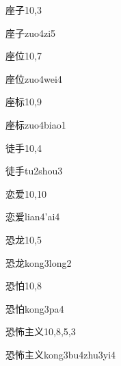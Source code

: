 \begin{entry}{座子}{10,3}
  \begin{phonetics}{座子}{zuo4zi5}
  \end{phonetics}
\end{entry}

\begin{entry}{座位}{10,7}
  \begin{phonetics}{座位}{zuo4wei4}
  \end{phonetics}
\end{entry}

\begin{entry}{座标}{10,9}
  \begin{phonetics}{座标}{zuo4biao1}
  \end{phonetics}
\end{entry}

\begin{entry}{徒手}{10,4}
  \begin{phonetics}{徒手}{tu2shou3}
  \end{phonetics}
\end{entry}

\begin{entry}{恋爱}{10,10}
  \begin{phonetics}{恋爱}{lian4'ai4}
  \end{phonetics}
\end{entry}

\begin{entry}{恐龙}{10,5}
  \begin{phonetics}{恐龙}{kong3long2}
  \end{phonetics}
\end{entry}

\begin{entry}{恐怕}{10,8}
  \begin{phonetics}{恐怕}{kong3pa4}
  \end{phonetics}
\end{entry}

\begin{entry}{恐怖主义}{10,8,5,3}
  \begin{phonetics}{恐怖主义}{kong3bu4zhu3yi4}
  \end{phonetics}
\end{entry}

